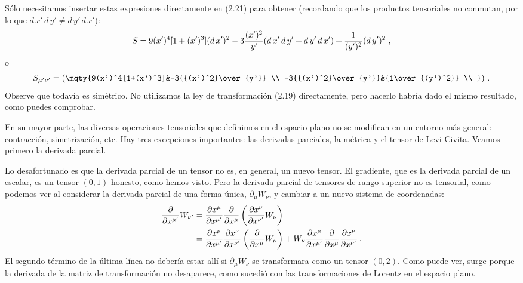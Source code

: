 \documentclass[11pt,b5paper,openany,twoside]{book}
\newcommand{\p}[1]{{\partial_{#1}}}
\begin{document}
Sólo necesitamos insertar estas expresiones directamente en (2.21) para obtener (recordando que los productos tensoriales no conmutan, por lo que $ d\,x'\, d\,y' \neq  d\,y' \, d\,x'$):
\begin{equation}
S= 9(x')^4[1+(x')^3]( d\,x')^2 -3{{(x')^2}\over{y'}}( d\,x' \, d\,y'
+ d\,y' \, d\,x') + {1\over{(y')^2}}( d\,y')^2\ ,\label{2.24}
\end{equation}
o
\begin{equation}
S_{\mu'\nu'} = \left(\mqty{9(x')^4[1+(x')^3]&-3{{(x')^2}\over{y'}} \\
-3{{(x')^2}\over{y'}}&{1\over{(y')^2}} \\ }\right)\,.\label{2.25}
\end{equation}
Observe que todavía es simétrico.
No utilizamos la ley de transformación (2.19) directamente, pero hacerlo habría dado el mismo resultado, como puedes comprobar.

En su mayor parte, las diversas operaciones tensoriales que definimos en el espacio plano no se modifican en un entorno más general: contracción, simetrización, etc.
Hay tres excepciones importantes: las derivadas parciales, la métrica y el tensor de Levi-Civita.
Veamos primero la derivada parcial.

Lo desafortunado es que la derivada parcial de un tensor no es, en general, un nuevo tensor.
El gradiente, que es la derivada parcial de un escalar, es un tensor $(0,1)$ honesto, como hemos visto.
Pero la derivada parcial de tensores de rango superior no es tensorial, como podemos ver al considerar la derivada parcial de una forma única, $\p\mu W_\nu$, y cambiar a un nuevo sistema de coordenadas:
\begin{align}
{{\partial}\over{\partial x^{\mu'}}}W_{\nu'} &=
{{\partial x^{\mu}}\over{\partial x^{\mu'}}}
{{\partial}\over{\partial x^{\mu}}}\left({{\partial x^{\nu}}
\over{\partial x^{\nu'}}}W_\nu\right)\nonumber \\
&=  {{\partial x^{\mu}}\over{\partial x^{\mu'}}}
{{\partial x^{\nu}}\over{\partial x^{\nu'}}}
\left({{\partial}\over{\partial x^{\mu}}}W_\nu\right)
+ W_\nu{{\partial x^{\mu}}\over{\partial x^{\mu'}}}
{{\partial}\over{\partial x^\mu}}
{{\partial x^{\nu}}\over{\partial x^{\nu'}}}\,.
\label{2.26}
\end{align}
El segundo término de la última línea no debería estar allí si $\p\mu W_\nu$ se transformara como un tensor $(0,2)$.
Como puede ver, surge porque la derivada de la matriz de transformación no desaparece, como sucedió con las transformaciones de Lorentz en el espacio plano.
\end{document}
